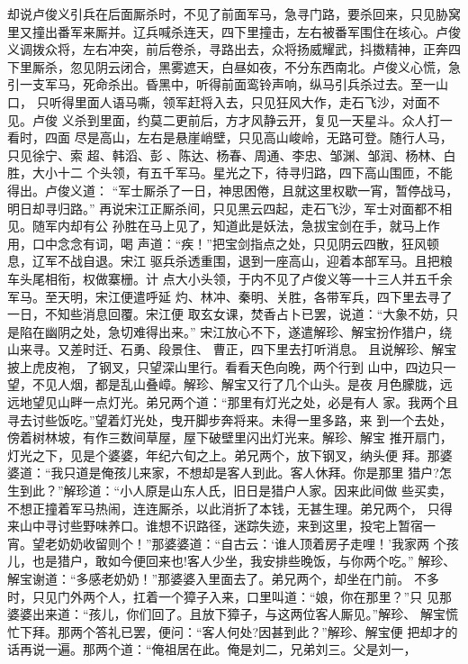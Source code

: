 却说卢俊义引兵在后面厮杀时，不见了前面军马，急寻门路，要杀回来，只见胁窝
里又撞出番军来厮并。辽兵喊杀连天，四下里撞击，左右被番军围住在垓心。卢俊
义调拨众将，左右冲突，前后卷杀，寻路出去，众将扬威耀武，抖擞精神，正奔四
下里厮杀，忽见阴云闭合，黑雾遮天，白昼如夜，不分东西南北。卢俊义心慌，急
引一支军马，死命杀出。昏黑中，听得前面鸾铃声响，纵马引兵杀过去。至一山口，
只听得里面人语马嘶，领军赶将入去，只见狂风大作，走石飞沙，对面不见。卢俊
义杀到里面，约莫二更前后，方才风静云开，复见一天星斗。众人打一看时，四面
尽是高山，左右是悬崖峭壁，只见高山峻岭，无路可登。随行人马，只见徐宁、索
超、韩滔、彭、陈达、杨春、周通、李忠、邹渊、邹润、杨林、白胜，大小十二
个头领，有五千军马。星光之下，待寻归路，四下高山围匝，不能得出。卢俊义道：
“军士厮杀了一日，神思困倦，且就这里权歇一宵，暂停战马，明日却寻归路。”
再说宋江正厮杀间，只见黑云四起，走石飞沙，军士对面都不相见。随军内却有公
孙胜在马上见了，知道此是妖法，急拔宝剑在手，就马上作用，口中念念有词，喝
声道：“疾！”把宝剑指点之处，只见阴云四散，狂风顿息，辽军不战自退。宋江
驱兵杀透重围，退到一座高山，迎着本部军马。且把粮车头尾相衔，权做寨栅。计
点大小头领，于内不见了卢俊义等一十三人并五千余军马。至天明，宋江便遣呼延
灼、林冲、秦明、关胜，各带军兵，四下里去寻了一日，不知些消息回覆。宋江便
取玄女课，焚香占卜已罢，说道：“大象不妨，只是陷在幽阴之处，急切难得出来。”
宋江放心不下，遂遣解珍、解宝扮作猎户，绕山来寻。又差时迁、石勇、段景住、
曹正，四下里去打听消息。
且说解珍、解宝披上虎皮袍，了钢叉，只望深山里行。看看天色向晚，两个行到
山中，四边只一望，不见人烟，都是乱山叠嶂。解珍、解宝又行了几个山头。是夜
月色朦胧，远远地望见山畔一点灯光。弟兄两个道：“那里有灯光之处，必是有人
家。我两个且寻去讨些饭吃。”望着灯光处，曳开脚步奔将来。未得一里多路，来
到一个去处，傍着树林坡，有作三数间草屋，屋下破壁里闪出灯光来。解珍、解宝
推开扇门，灯光之下，见是个婆婆，年纪六旬之上。弟兄两个，放下钢叉，纳头便
拜。那婆婆道：“我只道是俺孩儿来家，不想却是客人到此。客人休拜。你是那里
猎户?怎生到此？”解珍道：“小人原是山东人氏，旧日是猎户人家。因来此间做
些买卖，不想正撞着军马热闹，连连厮杀，以此消折了本钱，无甚生理。弟兄两个，
只得来山中寻讨些野味养口。谁想不识路径，迷踪失迹，来到这里，投宅上暂宿一
宵。望老奶奶收留则个！”那婆婆道：“自古云：‘谁人顶着房子走哩！’我家两
个孩儿，也是猎户，敢如今便回来也!客人少坐，我安排些晚饭，与你两个吃。”
解珍、解宝谢道：“多感老奶奶！”那婆婆入里面去了。弟兄两个，却坐在门前。
不多时，只见门外两个人，扛着一个獐子入来，口里叫道：“娘，你在那里？”只
见那婆婆出来道：“孩儿，你们回了。且放下獐子，与这两位客人厮见。”解珍、
解宝慌忙下拜。那两个答礼已罢，便问：“客人何处?因甚到此？”解珍、解宝便
把却才的话再说一遍。那两个道：“俺祖居在此。俺是刘二，兄弟刘三。父是刘一，
